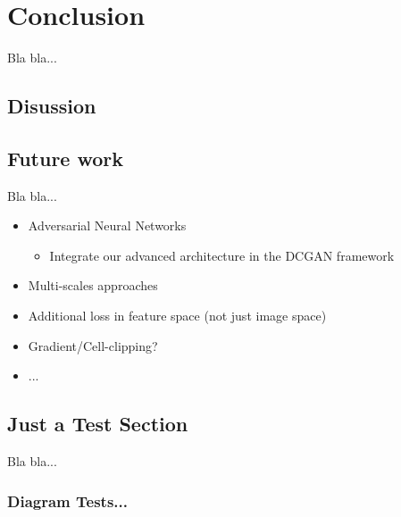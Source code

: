
\chapter{Conclusion} \label{chapter:conclusion}

Bla bla...


\section{Disussion}




\section{Future work}


Bla bla...

\begin{itemize}
\item Adversarial Neural Networks
	\begin{itemize}
	\item Integrate our advanced architecture in the DCGAN framework
	\end{itemize}
\item Multi-scales approaches
\item Additional loss in feature space (not just image space)
\item Gradient/Cell-clipping?
\item ...
\end{itemize}

\section{Just a Test Section}

Bla bla...


\subsection{Diagram Tests...}

